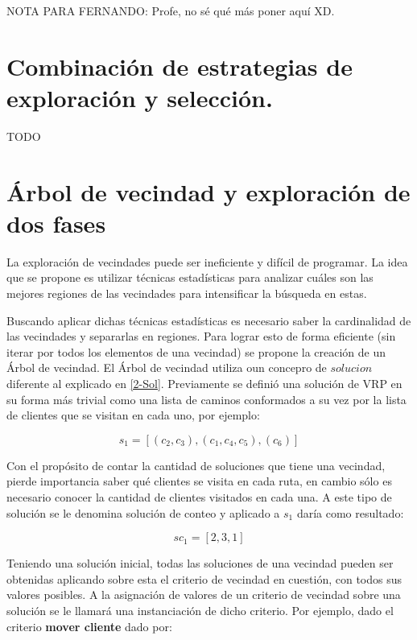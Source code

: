 NOTA PARA FERNANDO: Profe, no sé qué más poner aquí XD.

\section{Combinación de estrategias de exploración y selección.}\label{2-Heidy} 
TODO

\section{Árbol de vecindad y exploración de dos fases}\label{2-Hector}
La exploración de vecindades puede ser ineficiente y difícil de programar. La idea que se propone es utilizar técnicas estadísticas para analizar cuáles son las mejores regiones de las vecindades para intensificar la búsqueda en estas.

Buscando aplicar dichas técnicas estadísticas es necesario saber la cardinalidad de las vecindades y separarlas en regiones. Para lograr esto de forma eficiente (sin iterar por todos los elementos de una vecindad) se propone la creación de un Árbol de vecindad. El Árbol de vecindad utiliza oun concepro de $solucion$ diferente al explicado en \ref{2-Sol}. Previamente se definió una solución de VRP en su forma más trivial como una lista de caminos conformados a su vez por la lista de clientes que se visitan en cada uno, por ejemplo:

\begin{equation}
s_1 = [(c_2,c_3), (c_1,c_4,c_5), (c_6)]
\end{equation}

Con el propósito de contar la cantidad de soluciones que tiene una vecindad, pierde importancia saber qué clientes se visita en cada ruta, en cambio sólo es necesario conocer la cantidad de clientes visitados en cada una. A este tipo de solución se le denomina solución de conteo y aplicado a $s_1$ daría como resultado:

\begin{equation}
sc_1 = [2, 3, 1]
\end{equation}

Teniendo una solución inicial, todas las soluciones de una vecindad pueden ser obtenidas aplicando sobre esta el criterio de vecindad en cuestión, con todos sus valores posibles. A la asignación de valores de un criterio de vecindad sobre una solución se le llamará una instanciación de dicho criterio. Por ejemplo, dado el criterio \textbf{mover cliente} dado por: 

